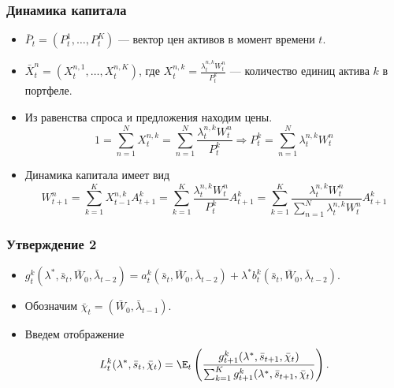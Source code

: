 \documentclass[aspectratio=169]{beamer}
\theoremstyle{definition}
\theoremstyle{remark}
\begin{document}
\begin{frame}\frametitle{Динамика капитала}
    \begin{itemize}
    \item $\bar P_t = (P_{t}^1,\ldots,P_{t}^K)$ — вектор цен активов в момент времени $t$.\\

    \item $\bar X_t^n=(X_{t}^{n,1},\dots,X_{t}^{n,K})$, где $X_{t}^{n,k}= \frac{\lambda_{t}^{n,k} W_t^n}{P_{t}^k}$ — количество единиц актива $k$ в портфеле.\\

	\item  Из равенства спроса и предложения находим цены.\\
     \[
    1 = \sum_{n=1}^{N}X_{t}^{n,k} 
    = \sum_{n=1}^{N}\frac{\lambda_{t}^{n,k}W_{t}^{n}}{P_{t}^k}
    \Rightarrow  \boxed {P_{t}^k = \sum_{n=1}^{N}\lambda_{t}^{n,k}W_{t}^{n}}
    \]
    
    \item Динамика капитала имеет вид
    $$
    W_{t+1}^n = \sum_{k=1}^K 
    X_{t-1}^{n,k} A_{t+1}^k =
    \sum_{k=1}^K \frac{\lambda_{t}^{n,k} W_t^n}{P_t^k} A_{t+1}^k=
    \boxed {\sum_{k=1}^K \frac{\lambda_{t}^{n,k} W_t^n}{\sum_{n=1}^N \lambda_{t}^{n,k} W_t^n} A_{t+1}^k}
    $$
    \end{itemize}
 
\end{frame}




\begin{frame}\frametitle{Утверждение 2}
\begin{itemize}
\item $
    g_{t}^k(\lambda^*, \bar s_t, \bar W_0,\bar\lambda_{t-2}) 
    = a_{t}^k(\bar s_t,\bar W_0,\bar\lambda_{t-2}) + \lambda^* b_{t}^k(\bar s_t,\bar W_0,\bar\lambda_{t-2}).
    $

\item Обозначим $\bar \chi_t=(\bar W_0,\bar\lambda_{t-1}).$
\item Введем отображение
    \[
    L_{t}^k(\lambda^*, \bar s_t,\bar\chi_t) 
    = \E_t\left(
      \frac{g_{t+1}^k(\lambda^*,\bar s_{t+1},\bar\chi_t)}
           {\sum_{k=1}^K g_{t+1}^k(\lambda^*,\bar s_{t+1},\bar\chi_t)} 
      \right).
    \]
\end{itemize}

\end{frame}
\end{document}
